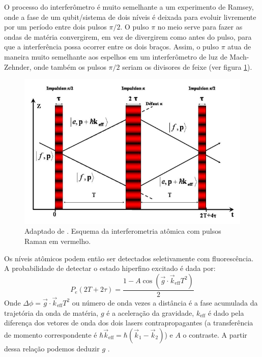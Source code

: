 O processo do interferômetro é muito semelhante a um experimento de Ramsey, onde a fase de um qubit/sistema de dois níveis é deixada para evoluir livremente por um período entre dois pulsos $\pi/2$. O pulso $\pi$ no meio serve para fazer as ondas de matéria convergirem, em vez de divergirem como antes do pulso, para que a interferência possa ocorrer entre os dois braços. Assim, o pulso $\pi$ atua de maneira muito semelhante aos espelhos em um interferômetro de luz de Mach-Zehnder, onde também os pulsos $\pi/2$ seriam os divisores de feixe (ver figura \ref{fig:interf}).

\begin{figure}
    \centering
    \includegraphics[width=0.7\linewidth]{figures/interferometry.png}
    \caption{Adaptado de \cite{cheinet2006conception}. Esquema da interferometria atômica com pulsos Raman em vermelho.}
    \label{fig:interf}
\end{figure}

Os níveis atômicos podem então ser detectados seletivamente com fluorescência. A probabilidade de detectar o estado hiperfino excitado é dada por:
\begin{equation}
P_e(2T+2\tau)= \frac{1- A\cos(\overrightarrow{g}\cdot \overrightarrow{k}_{\mathrm{eff}}T^2)}{2}
\end{equation}
Onde $\Delta\phi = \overrightarrow{g}\cdot \overrightarrow{k}_{\mathrm{eff}}T^2$ ou número de onda vezes a distância é a fase acumulada da trajetória da onda de matéria, $g$ é a aceleração da gravidade, $k_{\mathrm{eff}}$ é dado pela diferença dos vetores de onda dos dois lasers contrapropagantes (a transferência de momento correspondente é $\hbar \overrightarrow{k}_{\mathrm{eff}}= \hbar(\overrightarrow{k}_1-\overrightarrow{k}_2)$) e $A$ o contraste. A partir dessa relação podemos deduzir $g$ \cite{dos2008gravimetre}.


